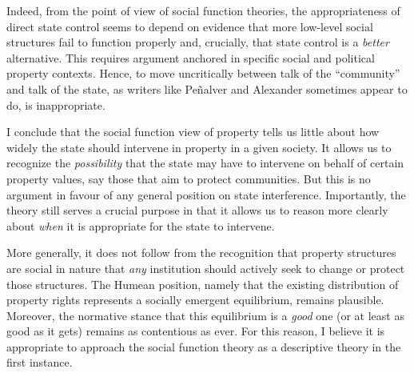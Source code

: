  Indeed, from the point of view of social function theories, the appropriateness of direct state control seems to depend on evidence that more low-level social structures fail to function properly and, crucially, that state control is a {\it better} alternative. This requires argument anchored in specific social and political property contexts. Hence, to move uncritically between talk of the ``community'' and talk of the state, as writers like Pe\~{n}alver and Alexander sometimes appear to do, is inappropriate.


I conclude that the social function view of property tells us little about how widely the state should intervene in property in a given society. It allows us to recognize the {\it possibility} that the state may have to intervene on behalf of certain property values, say those that aim to protect communities. But this is no argument in favour of any general position on state interference. Importantly, the theory still serves a crucial purpose in that it allows us to reason more clearly about {\it when} it is appropriate for the state to intervene. 

More generally, it does not follow from the recognition that property structures are social in nature that {\it any} institution should actively seek to change or protect those structures. The Humean position, namely that the existing distribution of property rights represents a socially emergent equilibrium, remains plausible. Moreover, the normative stance that this equilibrium is a {\it good} one (or at least as good as it gets) remains as contentious as ever. For this reason, I believe it is appropriate to approach the social function theory as a descriptive theory in the first instance.

